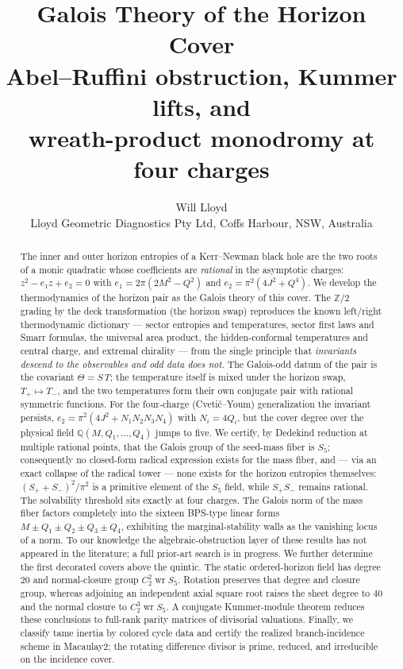 \documentclass[11pt]{article}
\title{\textbf{Galois Theory of the Horizon Cover}\\[4pt]
\large Abel--Ruffini obstruction, Kummer lifts, and\\
wreath-product monodromy at four charges\\[6pt]
\normalsize\fbox{PREPRINT v1.0 --- 11 July 2026}}
\author{Will Lloyd\\
\small Lloyd Geometric Diagnostics Pty Ltd, Coffs Harbour, NSW, Australia}
\date{}
\theoremstyle{definition}
\theoremstyle{remark}
\newcommand{\Q}{\mathbb{Q}}
\newcommand{\ZZ}{\mathbb{Z}}
\newcommand{\wrp}{\mathop{\mathrm{wr}}}
\begin{document}
\maketitle

\begin{abstract}
The inner and outer horizon entropies of a Kerr--Newman black hole are the two
roots of a monic quadratic whose coefficients are \emph{rational} in the
asymptotic charges: $z^2-e_1 z+e_2=0$ with $e_1=2\pi(2M^2-Q^2)$ and
$e_2=\pi^2(4J^2+Q^4)$. We develop the thermodynamics of the horizon pair as the
Galois theory of this cover. The $\ZZ/2$ grading by the deck transformation
(the horizon swap) reproduces the known left/right thermodynamic dictionary
--- sector entropies and temperatures, sector first laws and Smarr formulas,
the universal area product, the hidden-conformal temperatures and central
charge, and extremal chirality --- from the single principle that
\emph{invariants descend to the observables and odd data does not}. The
Galois-odd datum of the pair is the covariant $\Theta=S\,T$; the temperature
itself is mixed under the horizon swap, $T_+\mapsto T_-$, and the two
temperatures form their own conjugate pair with rational symmetric functions. For the four-charge
(Cveti\v{c}--Youm) generalization the invariant persists,
$e_2=\pi^2\!\left(4J^2+N_1N_2N_3N_4\right)$ with $N_i=4Q_i$, but the cover
degree over the physical field $\Q(M,Q_1,\dots,Q_4)$ jumps to five. We certify,
by Dedekind reduction at multiple rational points, that the Galois group of the
seed-mass fiber is $S_5$; consequently no closed-form radical expression exists
for the mass fiber, and --- via an exact collapse of the radical tower --- none
exists for the horizon entropies themselves: $(S_++S_-)^2/\pi^2$ is a primitive
element of the $S_5$ field, while $S_+S_-$ remains rational. The solvability
threshold sits exactly at four charges. The Galois norm of the mass fiber
factors completely into the sixteen BPS-type linear forms
$M\pm Q_1\pm Q_2\pm Q_3\pm Q_4$, exhibiting the marginal-stability walls as
the vanishing locus of a norm. To our knowledge the algebraic-obstruction layer
of these results has not appeared in the literature; a full prior-art search is
in progress.  We further determine the first decorated covers above the
quintic.  The static ordered-horizon field has degree $20$ and normal-closure
group $C_2^2\wrp S_5$.  Rotation preserves that degree and closure group,
whereas adjoining an independent axial square root raises the sheet degree to
$40$ and the normal closure to $C_2^3\wrp S_5$.  A conjugate Kummer-module
theorem reduces these conclusions to full-rank parity matrices of divisorial
valuations.  Finally, we classify tame inertia by colored cycle data and
certify the realized branch-incidence scheme in Macaulay2; the rotating
difference divisor is prime, reduced, and irreducible on the incidence cover.
\end{abstract}
\end{document}
